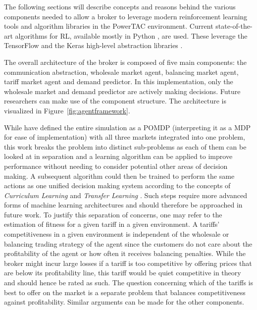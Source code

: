The following sections will describe concepts and reasons behind the various components needed to allow a broker to
leverage modern reinforcement learning tools and algorithm libraries in the \ac{PowerTAC} environment. Current
state-of-the-art algorithms for \ac{RL}, available mostly in Python \citep{baselines}, are used. These leverage the
TensorFlow and the Keras high-level abstraction libraries \citep{plappert2016kerasrl}.


The overall architecture of the broker is composed of five main components: the communication abstraction, wholesale market
agent, balancing market agent, tariff market agent and demand predictor. In this implementation, only the wholesale
market and demand predictor are actively making decisions. Future researchers can make use of the component structure.
The architecture is visualized in Figure~\ref{fig:agentframework}.

While \citep{tactexurieli2016mdp} have defined the entire simulation as a \ac{POMDP} (interpreting it as a
\ac{MDP} for ease of implementation) with all three markets integrated into one problem, this work breaks the problem
into distinct sub-problems as each of them can be looked at in separation and a learning algorithm
can be applied to improve performance without needing to consider potential other areas of decision making. A
subsequent algorithm could then be trained to perform the same actions as one unified decision making system according
to the concepts of \emph{Curriculum Learning}\citep{matiisen2017teacher} and \emph{Transfer Learning}
\citep{parisotto2015actor}. Such steps require more advanced forms of machine learning architectures and should
therefore be approached in future work.
To justify this separation of concerns, one may refer to the estimation of fitness for a given tariff in a given environment.
A tariffs' competitiveness in a given environment is independent of the wholesale or balancing trading strategy of the
agent since the customers do not care about the profitability of the agent or how often it receives balancing penalties.
While the broker might incur large losses if a tariff is too competitive by offering prices that are below its
profitability line, this tariff would be quiet competitive in theory and should hence be rated
as such. The question concerning which of the tariffs is best to offer on the market is a separate problem that balances
competitiveness against profitability. Similar arguments can be made for the other components.


